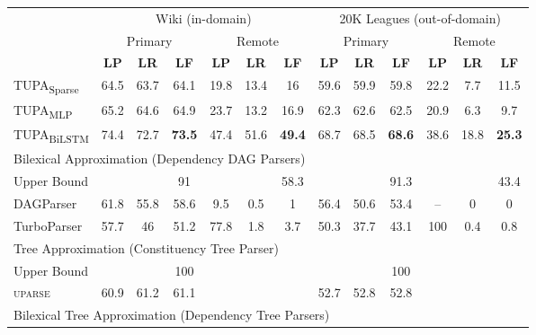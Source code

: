 \documentclass[11pt,a4paper]{article}
\newcommand{\parser}[1]{TUPA\textsubscript{#1}}
\begin{document}
\begin{table*}
\begin{tabular}{l|ccc|ccc||ccc|ccc}
& \multicolumn{6}{c||}{Wiki (in-domain)} & \multicolumn{6}{c}{20K Leagues (out-of-domain)} \\
& \multicolumn{3}{c|}{Primary} & \multicolumn{3}{c||}{Remote}
& \multicolumn{3}{c|}{Primary} & \multicolumn{3}{c}{Remote} \\
& \textbf{LP} & \textbf{LR} & \textbf{LF} & \textbf{LP} & \textbf{LR} & \textbf{LF}
& \textbf{LP} & \textbf{LR} & \textbf{LF} & \textbf{LP} & \textbf{LR} & \textbf{LF} \\
\hline
\parser{Sparse}
& 64.5 & 63.7 & 64.1 & 19.8 & 13.4 & 16
& 59.6 & 59.9 & 59.8 & 22.2 & 7.7 & 11.5 \\
\parser{MLP}
& 65.2 & 64.6 & 64.9 & 23.7 & 13.2 & 16.9
& 62.3 & 62.6 & 62.5 & 20.9 & 6.3 & 9.7 \\
\parser{BiLSTM}
& 74.4 & 72.7 & \textbf{73.5} & 47.4 & 51.6 & \textbf{49.4}
& 68.7 & 68.5 & \textbf{68.6} & 38.6 & 18.8 & \textbf{25.3} \\
\hline
\multicolumn{8}{l}{\rule{0pt}{2ex} \footnotesize
Bilexical Approximation (Dependency DAG Parsers)} \\
\small Upper Bound
& & & \small 91 & & & \small 58.3
& & & \small 91.3 & & & \small 43.4 \\
DAGParser
& 61.8 & 55.8 & 58.6 & 9.5 & 0.5 & 1
& 56.4 & 50.6 & 53.4 & -- & 0 & 0 \\
TurboParser
& 57.7 & 46 & 51.2 & 77.8 & 1.8 & 3.7
& 50.3 & 37.7 & 43.1 & 100 & 0.4 & 0.8 \\
\hline
\multicolumn{8}{l}{\rule{0pt}{2ex} \footnotesize
Tree Approximation (Constituency Tree Parser)} \\
\small Upper Bound
& & & \small 100 & & &
& & & \small 100 \\
\textsc{uparse}
& 60.9 & 61.2 & 61.1 & & &
& 52.7 & 52.8 & 52.8 \\
\hline
\multicolumn{8}{l}{\rule{0pt}{2ex} \footnotesize
Bilexical Tree Approximation (Dependency Tree Parsers)} \\

\end{tabular}
\end{table*}
\end{document}
